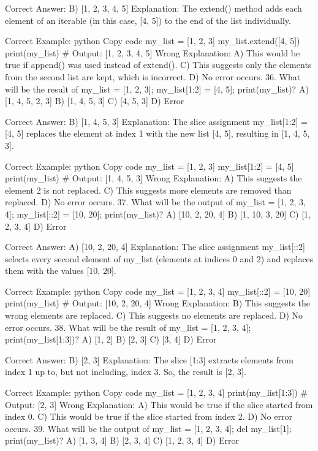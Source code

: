 Correct Answer: B) [1, 2, 3, 4, 5]
Explanation: The extend() method adds each element of an iterable (in this case, [4, 5]) to the end of the list individually.

Correct Example:
python
Copy code
my_list = [1, 2, 3]
my_list.extend([4, 5])
print(my_list)  # Output: [1, 2, 3, 4, 5]
Wrong Explanation:
A) This would be true if append() was used instead of extend().
C) This suggests only the elements from the second list are kept, which is incorrect.
D) No error occurs.
36. What will be the result of my_list = [1, 2, 3]; my_list[1:2] = [4, 5]; print(my_list)?
A) [1, 4, 5, 2, 3]
B) [1, 4, 5, 3]
C) [4, 5, 3]
D) Error

Correct Answer: B) [1, 4, 5, 3]
Explanation: The slice assignment my_list[1:2] = [4, 5] replaces the element at index 1 with the new list [4, 5], resulting in [1, 4, 5, 3].

Correct Example:
python
Copy code
my_list = [1, 2, 3]
my_list[1:2] = [4, 5]
print(my_list)  # Output: [1, 4, 5, 3]
Wrong Explanation:
A) This suggests the element 2 is not replaced.
C) This suggests more elements are removed than replaced.
D) No error occurs.
37. What will be the output of my_list = [1, 2, 3, 4]; my_list[::2] = [10, 20]; print(my_list)?
A) [10, 2, 20, 4]
B) [1, 10, 3, 20]
C) [1, 2, 3, 4]
D) Error

Correct Answer: A) [10, 2, 20, 4]
Explanation: The slice assignment my_list[::2] selects every second element of my_list (elements at indices 0 and 2) and replaces them with the values [10, 20].

Correct Example:
python
Copy code
my_list = [1, 2, 3, 4]
my_list[::2] = [10, 20]
print(my_list)  # Output: [10, 2, 20, 4]
Wrong Explanation:
B) This suggests the wrong elements are replaced.
C) This suggests no elements are replaced.
D) No error occurs.
38. What will be the result of my_list = [1, 2, 3, 4]; print(my_list[1:3])?
A) [1, 2]
B) [2, 3]
C) [3, 4]
D) Error

Correct Answer: B) [2, 3]
Explanation: The slice [1:3] extracts elements from index 1 up to, but not including, index 3. So, the result is [2, 3].

Correct Example:
python
Copy code
my_list = [1, 2, 3, 4]
print(my_list[1:3])  # Output: [2, 3]
Wrong Explanation:
A) This would be true if the slice started from index 0.
C) This would be true if the slice started from index 2.
D) No error occurs.
39. What will be the output of my_list = [1, 2, 3, 4]; del my_list[1]; print(my_list)?
A) [1, 3, 4]
B) [2, 3, 4]
C) [1, 2, 3, 4]
D) Error

